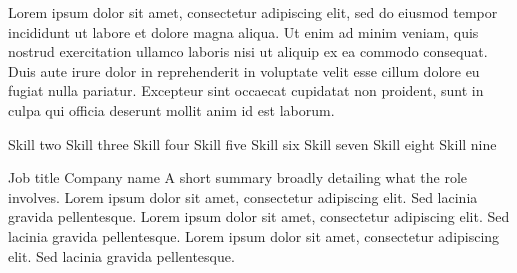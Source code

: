 \documentclass[letterpaper]{ReadableCV}
\begin{document}
	






\showHeader



Lorem ipsum dolor sit amet, consectetur adipiscing elit, sed do eiusmod tempor incididunt ut labore et dolore magna aliqua. Ut enim ad minim veniam, quis nostrud exercitation ullamco laboris nisi ut aliquip ex ea commodo consequat. Duis aute irure dolor in reprehenderit in voluptate velit esse cillum dolore eu fugiat nulla pariatur. Excepteur sint occaecat cupidatat non proident, sunt in culpa qui officia deserunt mollit anim id est laborum.


		  {Skill two}
		  {Skill three}
		  {Skill four}
		  {Skill five}
		  {Skill six}
		  {Skill seven}
		  {Skill eight}
		  {Skill nine}
		  


{}
        {Job title}
        {Company name}
        {A short summary broadly detailing what the role involves. Lorem ipsum dolor sit amet, consectetur adipiscing elit. Sed lacinia gravida pellentesque. Lorem ipsum dolor sit amet, consectetur adipiscing elit. Sed lacinia gravida pellentesque. Lorem ipsum dolor sit amet, consectetur adipiscing elit. Sed lacinia gravida pellentesque.}
\end{document}
